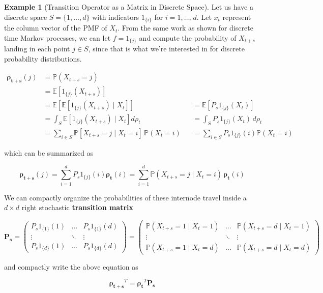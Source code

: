 \documentclass{article}
\theoremstyle{definition}
\newtheorem{example}{Example}[section]
\theoremstyle{remark}
\theoremstyle{definition}
\begin{document}
  \begin{example}[Transition Operator as a Matrix in Discrete Space]
    Let us have a discrete space $S = \{1, \ldots, d\}$ with indicators $1_{\{i\}}$ for $i = 1, \ldots, d$. Let $x_t$ represent the column vector of the PMF of $X_t$. From the same work as shown for discrete time Markov processes, we can let $f = 1_{\{j\}}$ and compute the probability of $X_{t + s}$ landing in each point $j \in S$, since that is what we're interested in for discrete probability distributions. 

    \begin{align*}
      \boldsymbol{\rho_{t + s}} (j) & = \mathbb{P}( X_{t + s} = j) \\ 
      & = \mathbb{E}[1_{\{j\}} (X_{t + s})] \\
      & = \mathbb{E} [ \mathbb{E}[ 1_{\{j\}} (X_{t + s}) \mid X_t] ] && = \mathbb{E}[P_s 1_{\{j\}} (X_t)] \\
      & = \int_S \mathbb{E}[ 1_{\{j\}} (X_{t + s}) \mid X_t] d\rho_t && = \int_S P_s 1_{\{j\}} (X_t) \,d \rho_t \\
      & = \sum_{i \in S} \mathbb{P}[ X_{t + s} = j \mid X_t = i] \, \mathbb{P} ( X_t = i) && = \sum_{i \in S} P_s 1_{\{j\}} (i) \mathbb{P}(X_t = i) 
    \end{align*}

    which can be summarized as 

      \[\boldsymbol{\rho_{t + s}} (j) = \sum_{i = 1}^d P_s 1_{\{j\}} (i) \boldsymbol{\rho_t} (i) = \sum_{i = 1}^d \mathbb{P}(X_{t + s} = j \mid X_t = i) \, \boldsymbol{\rho_t} (i)\]

    We can compactly organize the probabilities of these internode travel inside a $d \times d$ right stochastic \textbf{transition matrix}

      \[\mathbf{P_s} = \begin{pmatrix} P_s 1_{\{1\}} (1) & \ldots & P_s 1_{\{1\}} (d) \\ \vdots & \ddots & \vdots \\ P_s 1_{\{d\}} (1) & \ldots & P_s 1_{\{d\}} (d) \end{pmatrix} = \begin{pmatrix} \mathbb{P}(X_{t + s} = 1 \mid X_t = 1) & \ldots & \mathbb{P}(X_{t + s} = d \mid X_t = 1) \\ \vdots & \ddots & \vdots \\ \mathbb{P}(X_{t + s} = 1 \mid X_t = d) & \ldots & \mathbb{P}(X_{t + s} = d \mid X_t = d) \end{pmatrix} \]

    and compactly write the above equation as 

      \[\boldsymbol{\rho_{t + s}}^T = \boldsymbol{\rho_{t}}^T \mathbf{P_s}\]
  \end{example}
\end{document}
